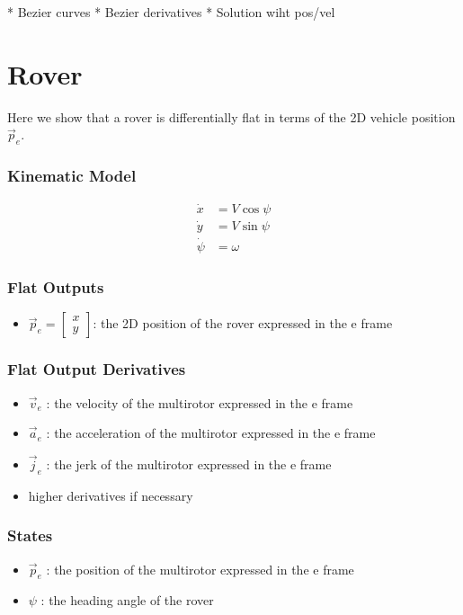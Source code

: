 \documentclass[10pt]{book}
\begin{document}
* Bezier curves
* Bezier derivatives
* Solution wiht pos/vel

\section{Rover}

Here we show that a rover is differentially flat in terms of the 2D vehicle position $\vec{p}_e$.

\subsubsection*{Kinematic Model}
\begin{align*}
    \dot{x} &= V \cos{\psi}  \\
    \dot{y} &= V \sin{\psi} \\
    \dot{\psi} &= \omega
\end{align*}

\subsubsection*{Flat Outputs}
\begin{itemize}
    \item $\vec{p}_e = \begin{bmatrix}x \\ y\end{bmatrix}$: the 2D position of the rover expressed in the e frame
\end{itemize}

\subsubsection*{Flat Output Derivatives}
\begin{itemize}
    \item $\vec{v}_e$ : the velocity of the multirotor expressed in the e frame
    \item $\vec{a}_e$ : the acceleration of the multirotor expressed in the e frame
    \item $\vec{j}_e$ : the jerk of the multirotor expressed in the e frame
    \item higher derivatives if necessary
\end{itemize}

\subsubsection*{States}
\begin{itemize}
    \item $\vec{p}_e$ : the position of the multirotor expressed in the e frame
    \item $\psi$ : the heading angle of the rover
\end{itemize}
\end{document}
